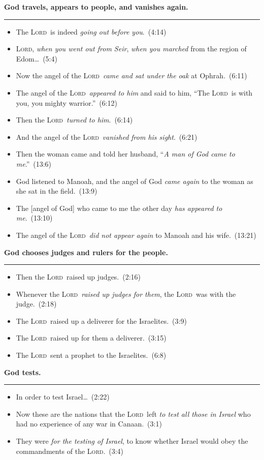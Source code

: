 \documentclass{article}
\newcommand{\godcategory}[1]{\bigskip\noindent \textbf{#1}\smallskip\hrule\nopagebreak}
\newcommand{\Lord}{\textsc{Lord}}
\newcommand{\elips}{\thinspace\ldots}
\begin{document}
\begin{landscape}
\begin{multicols}{3}
\godcategory{God travels, appears to people, and vanishes again.}
\begin{itemize}
  \item The \Lord\ is indeed \emph{going out before you}.~(4:14)
  \item \Lord, \emph{when you went out from Seir}, \emph{when you marched} from the region of Edom\elips~(5:4)
  \item Now the angel of the \Lord\ \emph{came and sat under the oak} at Ophrah.~(6:11)
  \item The angel of the \Lord\ \emph{appeared to him} and said to him, “The \Lord\ is with you, you mighty warrior.”~(6:12)
  \item Then the \Lord\ \emph{turned to him}.~(6:14)
  \item And the angel of the \Lord\ \emph{vanished from his sight}.~(6:21)
  \item Then the woman came and told her husband, “\emph{A man of God came to me}.”~(13:6)
  \item God listened to Manoah, and the angel of God \emph{came again} to the woman as she sat in the field.~(13:9)
  \item The [angel of God] who came to me the other day \emph{has appeared to me}.~(13:10)
  \item The angel of the \Lord\ \emph{did not appear again} to Manoah and his wife.~(13:21)
\end{itemize}

\godcategory{God chooses judges and rulers for the people.}
\begin{itemize}
  \item Then the \Lord\ raised up judges.~(2:16)
  \item Whenever the \Lord\ \emph{raised up judges for them}, the \Lord\ was with the judge.~(2:18)
  \item The \Lord\ raised up a deliverer for the Israelites.~(3:9)
  \item The \Lord\ raised up for them a deliverer.~(3:15)
  \item The \Lord\ sent a prophet to the Israelites.~(6:8)
\end{itemize}

\godcategory{God tests.}
\begin{itemize}
  \item In order to test Israel\elips~(2:22)
  \item Now these are the nations that the \Lord\ left \emph{to test all those in Israel} who had no experience of any war in Canaan.~(3:1)
  \item They were \emph{for the testing of Israel}, to know whether Israel would obey the commandments of the \Lord.~(3:4)
\end{itemize}


\end{multicols}
\end{landscape}
\end{document}

